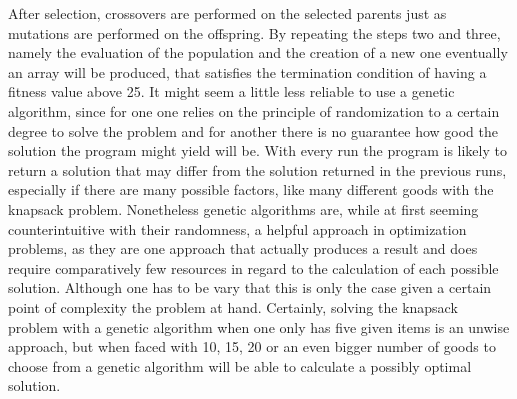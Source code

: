 \documentclass[11pt,a4paper]{article}
\begin{document}
After selection, crossovers are performed on the selected parents just as mutations are performed on the offspring.
By repeating the steps two and three, namely the evaluation of the population and the creation of a new one eventually an array will be produced, that satisfies the termination condition of having a fitness value above 25.
It might seem a little less reliable to use a genetic algorithm, since for one one relies on the principle of randomization to a certain degree to solve the problem and for another there is no guarantee how good the solution the program might yield will be. With every run the program is likely to return a solution that may differ from the solution returned in the previous runs, especially if there are many possible factors, like many different goods with the knapsack problem.
Nonetheless genetic algorithms are, while at first seeming counterintuitive with their randomness, a helpful approach in optimization problems, as they are one approach that actually produces a result and does require comparatively few resources in regard to the calculation of each possible solution. Although one has to be vary that this is only the case given a certain point of complexity the problem at hand.
Certainly, solving the knapsack problem with a genetic algorithm when one only has five given items is an unwise approach, but when faced with 10, 15, 20 or an even bigger number of goods to choose from a genetic algorithm will be able to calculate a possibly optimal solution.


\nocite{*}
\printbibliography
{}
\end{document}
